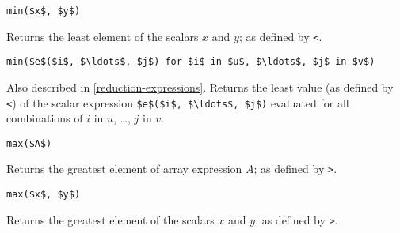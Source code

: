 \begin{operatordefinition*}[min]\label{modelica:min-binary}
\begin{synopsis}\begin{lstlisting}
min($x$, $y$)
\end{lstlisting}\end{synopsis}
\begin{semantics}
Returns the least element of the scalars $x$ and $y$; as defined by \lstinline!<!.
\end{semantics}
\end{operatordefinition*}

\begin{operatordefinition*}[min]\label{modelica:min-reduction}
\begin{synopsis}\begin{lstlisting}
min($e$($i$, $\ldots$, $j$) for $i$ in $u$, $\ldots$, $j$ in $v$)
\end{lstlisting}\end{synopsis}
\begin{semantics}
Also described in \cref{reduction-expressions}.  Returns the least value (as defined by \lstinline!<!) of the scalar expression \lstinline!$e$($i$, $\ldots$, $j$)! evaluated for all combinations of $i$ in $u$, \ldots, $j$ in $v$.
\end{semantics}
\end{operatordefinition*}

\begin{operatordefinition*}[max]\label{modelica:max-of-array}
\begin{synopsis}\begin{lstlisting}
max($A$)
\end{lstlisting}\end{synopsis}
\begin{semantics}
Returns the greatest element of array expression $A$; as defined by \lstinline!>!.
\end{semantics}
\end{operatordefinition*}

\begin{operatordefinition*}[max]\label{modelica:max-binary}
\begin{synopsis}\begin{lstlisting}
max($x$, $y$)
\end{lstlisting}\end{synopsis}
\begin{semantics}
Returns the greatest element of the scalars $x$ and $y$; as defined by \lstinline!>!.
\end{semantics}
\end{operatordefinition*}

